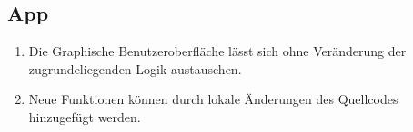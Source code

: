 \subsection{App}

\begin{enumerate}
    \item Die Graphische Benutzeroberfläche lässt sich ohne Veränderung der zugrundeliegenden Logik austauschen.
    \item Neue Funktionen können durch lokale Änderungen des Quellcodes hinzugefügt werden.
\end{enumerate}